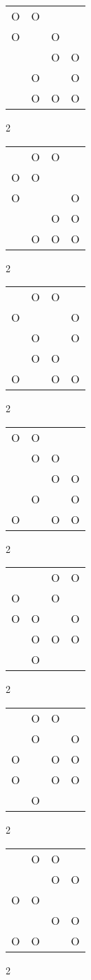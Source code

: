 \begin{tabular}{|m{0.2cm}m{0.2cm}m{0.2cm}m{0.2cm}|}\hline
O&O& & \\
O& &O& \\
 & &O&O\\
 &O& &O\\
 &O&O&O\\
\hline\end{tabular}2
\begin{tabular}{|m{0.2cm}m{0.2cm}m{0.2cm}m{0.2cm}|}\hline
 &O&O& \\
O&O& & \\
O& & &O\\
 & &O&O\\
 &O&O&O\\
\hline\end{tabular}2
\begin{tabular}{|m{0.2cm}m{0.2cm}m{0.2cm}m{0.2cm}|}\hline
 &O&O& \\
O& & &O\\
 &O& &O\\
 &O&O& \\
O& &O&O\\
\hline\end{tabular}2
\begin{tabular}{|m{0.2cm}m{0.2cm}m{0.2cm}m{0.2cm}|}\hline
O&O& & \\
 &O&O& \\
 & &O&O\\
 &O& &O\\
O& &O&O\\
\hline\end{tabular}2
\begin{tabular}{|m{0.2cm}m{0.2cm}m{0.2cm}m{0.2cm}|}\hline
 & &O&O\\
O& &O& \\
O&O& &O\\
 &O&O&O\\
 &O& & \\
\hline\end{tabular}2
\begin{tabular}{|m{0.2cm}m{0.2cm}m{0.2cm}m{0.2cm}|}\hline
 &O&O& \\
 &O& &O\\
O& &O&O\\
O& &O&O\\
 &O& & \\
\hline\end{tabular}2
\begin{tabular}{|m{0.2cm}m{0.2cm}m{0.2cm}m{0.2cm}|}\hline
 &O&O& \\
 & &O&O\\
O&O& & \\
 & &O&O\\
O&O& &O\\
\hline\end{tabular}2
